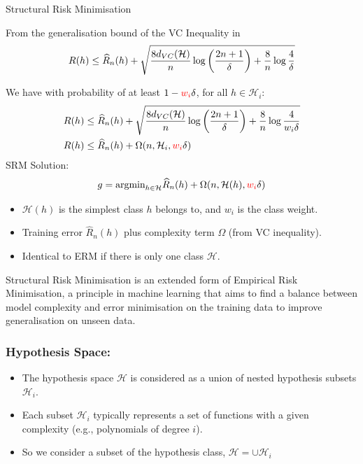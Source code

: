 \begin{definitionbox}{Structural Risk Minimisation}


From the generalisation bound of the VC Inequality in
\[R(h) \leq \widehat{R}_n(h) + \sqrt{\frac{8d_{VC}(\mathcal{H})}{n} \log\left(\frac{2n + 1}{\delta}\right) + \frac{8}{n} \log\frac{4}{\delta}}\\\]

We have with probability of at least $1-{\color{red} w_i}\delta$, for all $h \in \mathcal{H}_i$:
    \begin{align*}
R(h) &\leq \widehat{R}_n(h) + \sqrt{\frac{8d_{VC}(\mathcal{H})}{n} \log\left(\frac{2n + 1}{\delta}\right) + \frac{8}{n} \log\frac{4}{w_i\delta}}\\
R(h) &\leq \widehat{R}_n(h) + \Omega(n, \mathcal{H}_i, {\color{red} w_i}\delta)    
    \end{align*}
SRM Solution: 
    \[g = \text{argmin}_{h \in \mathcal{H}}\widehat{R}_n(h) + \Omega(n, \mathcal{H}(h), {\color{red} w_i}\delta)\]

    \begin{itemize}
        \item $\mathcal{H}(h)$ is the simplest class $h$ belongs to, and $w_i$ is the class weight.
        \item Training error $\hat{R}_n(h)$ plus complexity term $\Omega$ (from VC inequality).
        \item Identical to ERM if there is only one class $\mathcal{H}$.
    \end{itemize}

    \end{definitionbox}


Structural Risk Minimisation is an extended form of Empirical Risk Minimisation, a principle in machine learning that aims to find a balance between model complexity and error minimisation on the training data to improve generalisation on unseen data.

\subsubsection*{Hypothesis Space:}
\begin{itemize}
    \item The hypothesis space $\mathcal{H}$ is considered as a union of nested hypothesis subsets $\mathcal{H}_i$.
    \item Each subset $\mathcal{H}_i$ typically represents a set of functions with a given complexity (e.g., polynomials of degree $i$).
    \item So we consider a subset of the hypothesis class, $\mathcal{H} = \cup \mathcal{H}_i$
\end{itemize}

